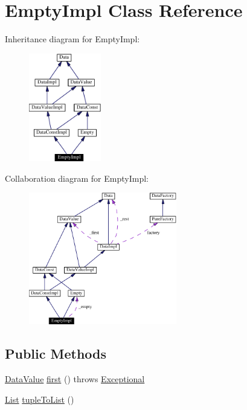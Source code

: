 \hypertarget{classEmptyImpl}{
\section{Empty\-Impl  Class Reference}
\label{classEmptyImpl}
}
Inheritance diagram for Empty\-Impl:\begin{figure}[H]
\begin{center}
\leavevmode
\includegraphics[width=89pt]{classEmptyImpl__inherit__graph}
\end{center}
\end{figure}
Collaboration diagram for Empty\-Impl:\begin{figure}[H]
\begin{center}
\leavevmode
\includegraphics[width=183pt]{classEmptyImpl__coll__graph}
\end{center}
\end{figure}
\subsection*{Public Methods}
\begin{CompactItemize}
\item 
\hyperlink{interfaceDataValue}{Data\-Value} \hyperlink{classEmptyImpl_a0}{first} () throws \hyperlink{classExceptional}{Exceptional}
\item 
\hyperlink{interfaceList}{List} \hyperlink{classEmptyImpl_a1}{tuple\-To\-List} ()
\end{CompactItemize}
